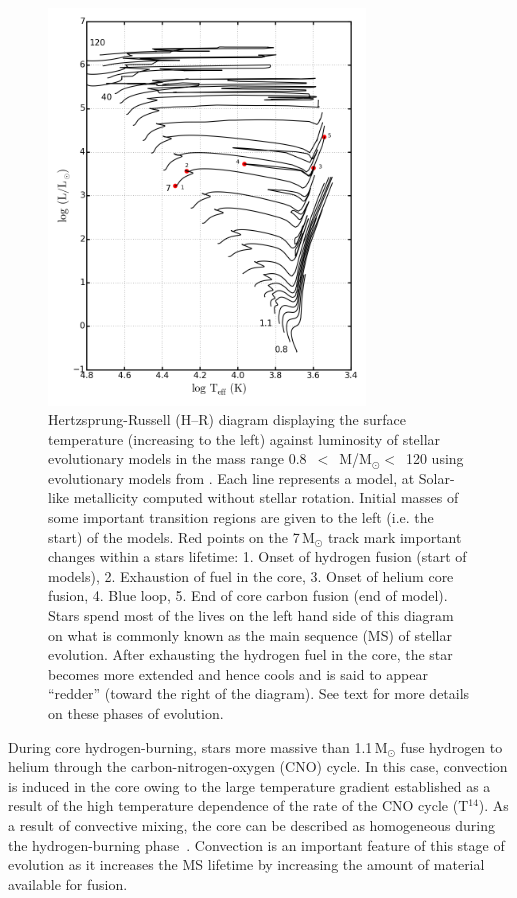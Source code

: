\begin{figure}
 \centering
 \includegraphics[width=0.75\textwidth]{intro/HRD-geneva}
 \caption[Hertzsprung-Russell (H--R) diagram of stars]{
Hertzsprung-Russell (H--R) diagram displaying the surface temperature (increasing to the left) against luminosity of stellar evolutionary models in the mass range
0.8~$<$~M/M$_{\odot}<$~120 using evolutionary models from
\protect\citet{2012A&A...537A.146E}.
Each line represents a model, at Solar-like metallicity computed without stellar rotation.
Initial masses of some important transition regions are given to the left (i.e. the start) of the models.
Red points on the 7\,M$_{\odot}$ track mark important changes within a stars lifetime:
1. Onset of hydrogen fusion (start of models),
2. Exhaustion of fuel in the core,
3. Onset of helium core fusion,
4. Blue loop,
5. End of core carbon fusion (end of model).
Stars spend most of the lives on the left hand side of this diagram on what is commonly known as the main sequence (MS) of stellar evolution.
After exhausting the hydrogen fuel in the core, the star becomes more extended and hence cools and is said to appear ``redder'' (toward the right of the diagram).
See text for more details on these phases of evolution.
 \label{fig:HRD}}
\end{figure}


During core hydrogen-burning, stars more massive than 1.1\,M$_{\odot}$ fuse hydrogen to helium through the carbon-nitrogen-oxygen (CNO) cycle.
In this case, convection is induced in the core owing to the large temperature gradient established as a result of the high temperature dependence of the rate of the CNO cycle (T$^{14}$).
As a result of convective mixing, the core can be described as homogeneous during the hydrogen-burning phase~\citep{2012sse..book.....K}.
Convection is an important feature of this stage of evolution as it increases the MS lifetime by increasing the amount of material available for fusion.

